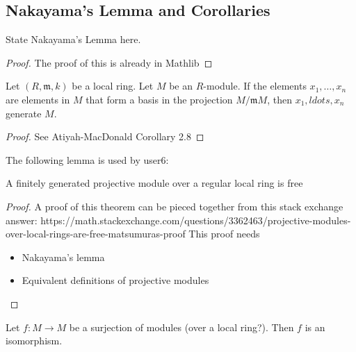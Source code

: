 
\subsection{Nakayama's Lemma and Corollaries}

\begin{lemma}
  \label{lem:nakayama}
  State Nakayama's Lemma here.
\end{lemma}

\begin{proof}
  The proof of this is already in Mathlib
\end{proof}

\begin{corollary}
  \label{cor:local_maximal_gereating_set_basis_residue}
  Let $(R,\mathfrak{m},k)$ be a local ring. 
  Let $M$ be an $R$-module.
  If the elements $x_1, \ldots, x_n$ are elements in
  $M$ that form a basis in the projection 
  $M / \mathfrak{m} M$, then $x_1, ldots, x_n$ generate $M$.
\end{corollary}

\begin{proof}
  See Atiyah-MacDonald Corollary 2.8
\end{proof}

The following lemma is used by user6:

\begin{lemma} \label{lem:fin_gen_proj_over_local_is_free}
	A finitely generated projective module 
	over a regular local ring is free
\end{lemma}

\begin{proof}
	A proof of this theorem can be pieced together from this
	stack exchange answer:
	https://math.stackexchange.com/questions/3362463/projective-modules-over-local-rings-are-free-matsumuras-proof
	This proof needs
	\begin{itemize}
		\item Nakayama's lemma
		\item Equivalent definitions of projective modules
	\end{itemize}
\end{proof}

\begin{lemma}
  \label{lem:surj_endo_is_isom}
  Let $f : M \to M$ be a surjection of modules 
  (over a local ring?).
  Then $f$ is an isomorphism.
\end{lemma}

